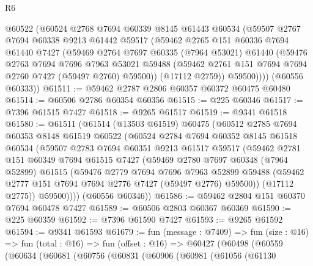 \begin{lexlean}{R6}
\begin{coremodule}
        @60522
        (@60524
          @2768
          @7694
          @60339
          @8145
          @61443
          @60534
          (@59507
            @2767
            @7694
            @60338
            @9213
            @61442
            @59517
            (@59462
              @2765
              @151
              @60336
              @7694
              @61440
              @7427
              (@59469
                @2764
                @7697
                @60335
                (@7964 @53021)
                @61440
                (@59476
                  @2763
                  @7694
                  @7696
                  @7963
                  @53021
                  @59488
                  (@59462 @2761 @151 @7694 @7694 @2760 @7427 (@59497 @2760) @59500))
                (@17112 @2759))
              @59500))))
      (@60556 @60333))
@61511 := @59462 @2787 @2806 @60357 @60372 @60475 @60480
@61514 := @60506 @2786 @60354 @60356
@61515 := @225 @60346
@61517 := @7396 @61515 @7427
@61518 := @9265 @61517
@61519 := @9341 @61518
@61580 := @61511
    (@61514
      (@13503 @61519)
      @60475
      (@60512
        @2785
        @7694
        @60353
        @8148
        @61519
        @60522
        (@60524
          @2784
          @7694
          @60352
          @8145
          @61518
          @60534
          (@59507
            @2783
            @7694
            @60351
            @9213
            @61517
            @59517
            (@59462
              @2781
              @151
              @60349
              @7694
              @61515
              @7427
              (@59469
                @2780
                @7697
                @60348
                (@7964 @52899)
                @61515
                (@59476
                  @2779
                  @7694
                  @7696
                  @7963
                  @52899
                  @59488
                  (@59462 @2777 @151 @7694 @7694 @2776 @7427 (@59497 @2776) @59500))
                (@17112 @2775))
              @59500))))
      (@60556 @60346))
@61586 := @59462 @2804 @151 @60370 @7694 @60478 @7427
@61589 := @60506 @2803 @60367 @60369
@61590 := @225 @60359
@61592 := @7396 @61590 @7427
@61593 := @9265 @61592
@61594 := @9341 @61593
@61679 := fun (message : @7409) =>
  fun (size : @16) =>
  fun (total : @16) =>
  fun (offset : @16) =>
  @60427
    (@60498
      (@60559
        (@60634
          (@60681
            (@60756
              (@60831
                (@60906
                  (@60981
                    (@61056
                      (@61130

\end{coremodule}
\end{lexlean}
